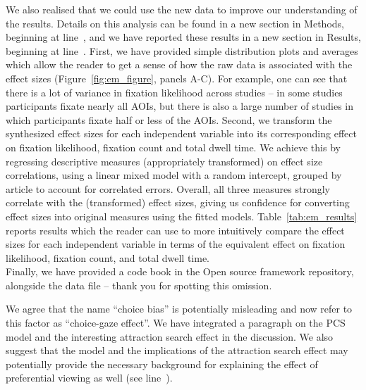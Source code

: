 We also realised that we could use the new data to improve our understanding of the results. Details on this analysis can be found in a new section in Methods, beginning at line~, and we have reported these results in a new section in Results, beginning at line~.
First, we have provided simple distribution plots and averages which allow the reader to get a sense of how the raw data is associated with the effect sizes (Figure~\ref{fig:em_figure}, panels A-C). For example, one can see that there is a lot of variance in fixation likelihood across studies -- in some studies participants fixate nearly all AOIs, but there is also a large number of studies in which participants fixate half or less of the AOIs. Second, we transform the synthesized effect sizes for each independent variable into its corresponding effect on fixation likelihood, fixation count and total dwell time. We achieve this by regressing descriptive measures (appropriately transformed) on effect size correlations, using a linear mixed model with a random intercept, grouped by article to account for correlated errors. Overall, all three measures strongly correlate with the (transformed) effect sizes, giving us confidence for converting effect sizes into original measures using the fitted models. Table~\ref{tab:em_results} reports results which the reader can use to more intuitively compare the effect sizes for each independent variable in terms of the equivalent effect on fixation likelihood, fixation count, and total dwell time.\\

Finally, we have provided a code book in the Open source framework repository, alongside the data file -- thank you for spotting this omission.



We agree that the name ``choice bias'' is potentially misleading and now refer to this factor as ``choice-gaze effect''. We have integrated a paragraph on the PCS model and the interesting attraction search effect in the discussion. We also suggest that the model and the implications of the attraction search effect may potentially provide the necessary background for explaining the effect of preferential viewing  as well (see line~).  

